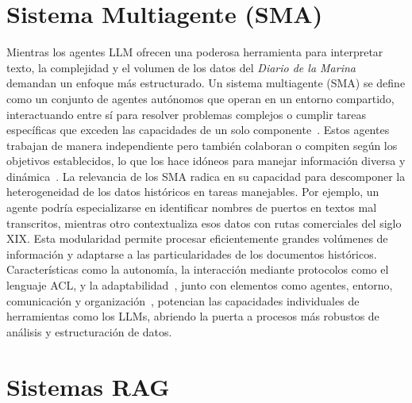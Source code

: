 \section{Sistema Multiagente (SMA)}\label{seq_2}

Mientras los agentes LLM ofrecen una poderosa herramienta para interpretar texto, la complejidad y el volumen de los datos del \textit{Diario de la Marina} demandan un enfoque más estructurado. Un sistema multiagente (SMA) se define como un conjunto de agentes autónomos que operan en un entorno compartido, interactuando entre sí para resolver problemas complejos o cumplir tareas específicas que exceden las capacidades de un solo componente~\cite{zambrano2020multiagent}. Estos agentes trabajan de manera independiente pero también colaboran o compiten según los objetivos establecidos, lo que los hace idóneos para manejar información diversa y dinámica~\cite{perezpons2021brief}.
La relevancia de los SMA radica en su capacidad para descomponer la heterogeneidad de los datos históricos en tareas manejables. Por ejemplo, un agente podría especializarse en identificar nombres de puertos en textos mal transcritos, mientras otro contextualiza esos datos con rutas comerciales del siglo XIX. Esta modularidad permite procesar eficientemente grandes volúmenes de información y adaptarse a las particularidades de los documentos históricos. Características como la autonomía, la interacción mediante protocolos como el lenguaje ACL, y la adaptabilidad~\cite{perezpons2021brief}, junto con elementos como agentes, entorno, comunicación y organización~\cite{zambrano2020multiagent}, potencian las capacidades individuales de herramientas como los LLMs, abriendo la puerta a procesos más robustos de análisis y estructuración de datos.

\section{Sistemas RAG}\label{seq_4}

